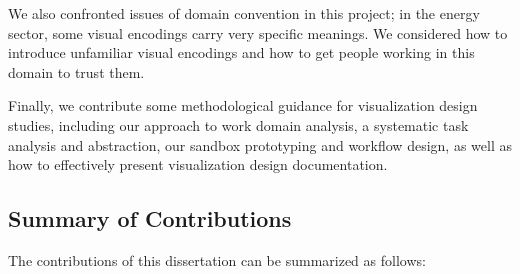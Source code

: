 We also confronted issues of domain convention in this project; in the energy sector, some visual encodings carry very specific meanings. 
We considered how to introduce unfamiliar visual encodings and how to get people working in this domain to trust them.

Finally, we contribute some methodological guidance for visualization design studies, including our approach to work domain analysis, a systematic task analysis and abstraction, our sandbox prototyping and workflow design, as well as how to effectively present visualization design documentation.


\subsection{Summary of Contributions}
\label{intro:contrib-summary}


The contributions of this dissertation can be summarized as follows:

